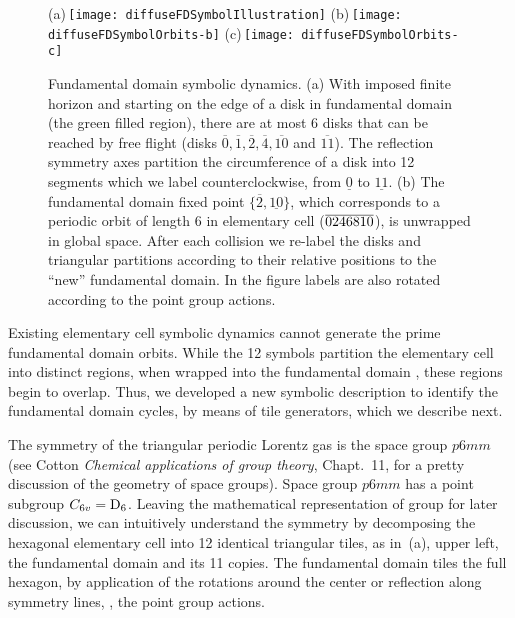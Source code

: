 \begin{figure}[htbp]
  (a)\,\texttt{[image: diffuseFDSymbolIllustration]}
  (b)\,\texttt{[image: diffuseFDSymbolOrbits-b]}
  (c)\,\texttt{[image: diffuseFDSymbolOrbits-c]}
  \caption{\label{fig-fdflights}
  Fundamental domain symbolic dynamics.
  (a) With  imposed finite horizon and starting on the edge of a disk in
  fundamental  domain (the green filled region), there are at most 6
  disks that can be reached by free flight (disks
  $\overline{0},\overline{1},\overline{2},\overline{4},\overline{10}$ and
  $\overline{11}$).
  The reflection symmetry axes partition the circumference of
  a disk into 12 segments which we
  label counterclockwise, from $\underline{0}$ to $\underline{11}$.
  (b) The fundamental domain fixed point
  $\{\overline{2},\underline{10}\}$, which corresponds to a periodic
  orbit of length 6 in elementary cell (${\overline{0246810}}$), is unwrapped
  in   global space. After each collision we re-label the disks and
  triangular   partitions according to their relative positions to the
  ``new'' fundamental   domain. In the figure labels are also rotated
  according to the point   group actions.
  }
\end{figure}

Existing elementary cell symbolic dynamics cannot generate the prime
fundamental domain orbits. While the 12 symbols partition the
elementary cell {\statesp} into distinct regions, when wrapped into
the fundamental domain {\statesp}, these regions begin to overlap.
Thus, we developed a new symbolic description to identify
the fundamental domain cycles, by means of tile generators,
which we describe next.

The symmetry of the triangular periodic Lorentz gas is the space group
$p6mm$ (see Cotton {\em Chemical applications of group
theory},  Chapt.~11, for a pretty discussion of the geometry of space
groups). Space group $p6mm$ has a point subgroup $C_{6v}=\textrm{D}_{6}$.
Leaving the mathematical representation of group for later discussion,
we can intuitively understand the symmetry by decomposing the
hexagonal elementary cell into 12 identical triangular tiles, as in
\,(a), upper left, the fundamental domain
and its 11 copies. The fundamental domain tiles the full hexagon, by
application of the  rotations around the center or reflection
along symmetry lines, \ie, the point group actions.

